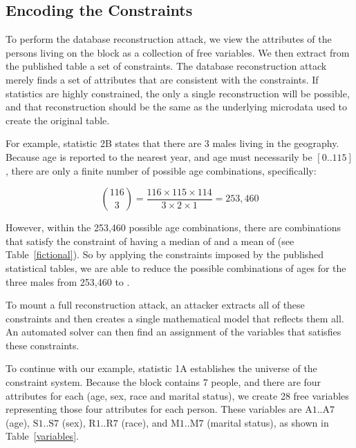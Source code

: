 \documentclass[runningheads]{llncs}
\begin{document}
\subsection{Encoding the Constraints}

To perform the database reconstruction attack, we view the attributes
of the persons living on the block as a collection of 
free variables. We then extract from the published table a set of
constraints. The database reconstruction attack merely finds a set of
attributes that are consistent with the constraints. If statistics are
highly constrained, the only a single reconstruction will be
possible, and that reconstruction should be the same as the underlying
microdata used to create the original table.

For example, statistic 2B states that there are 3 males living in the
geography.  Because age is reported to the nearest year, and
age must necessarily be $[ 0 .. 115]$, there
are only a finite number of possible age combinations, specifically:

\[ \binom{116}{3}=\frac{116 \times 115 \times 114}{3 \times 2 \times
  1} = 253,460 \]


However, within the 253,460 possible age combinations, there are \mycount{} combinations that satisfy the
constraint of having a median of \mymedian{} and a mean of \mymean{}
(see Table~\ref{fictional}). So by applying the constraints imposed by the
published statistical tables, we are able to reduce the possible
combinations of ages for the three males from 253,460 to \mycount.

To mount a full reconstruction attack, an attacker extracts all of these
constraints and then creates a
single mathematical model that reflects them all. An automated solver can then
find an assignment of the variables that satisfies these constraints. 

To continue with our example, statistic 1A establishes the universe of
the constraint system. Because the block contains 7 people, and there
are four attributes for each (age, sex, race and marital status), we
create 28 free variables representing those four attributes for each
person. These variables are $\textrm{A}1..\textrm{A}7$ (age),
$\textrm{S}1..\textrm{S}7$ (sex), $\textrm{R}1..\textrm{R}7$ (race),
and $\textrm{M}1..\textrm{M}7$ (marital status), as shown in
Table~\ref{variables}.
\end{document}
